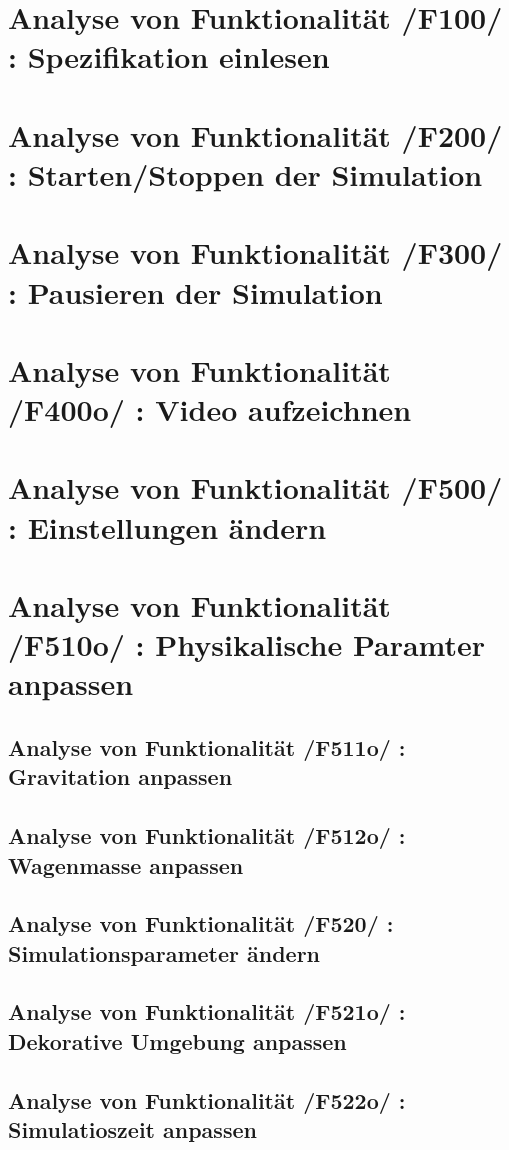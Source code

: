 \section{Analyse von Funktionalität /F100/ :  Spezifikation einlesen }
\section{Analyse von Funktionalität /F200/ :  Starten/Stoppen der Simulation}
\section{Analyse von Funktionalität /F300/ :  Pausieren der Simulation}
\section{Analyse von Funktionalität /F400o/ :  Video aufzeichnen}
\section{Analyse von Funktionalität /F500/ :  Einstellungen ändern}
\section{Analyse von Funktionalität /F510o/ :  Physikalische Paramter anpassen}
\subsection{Analyse von Funktionalität /F511o/ :  Gravitation anpassen}
\subsection{Analyse von Funktionalität /F512o/ :  Wagenmasse anpassen}
\subsection{Analyse von Funktionalität /F520/ :  Simulationsparameter ändern}
\subsection{Analyse von Funktionalität /F521o/ :  Dekorative Umgebung anpassen}
\subsection{Analyse von Funktionalität /F522o/ :  Simulatioszeit anpassen}

